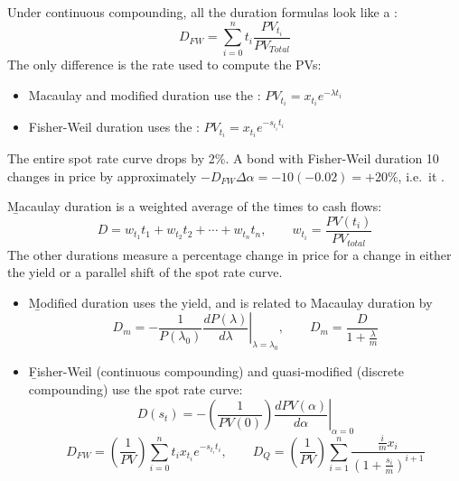 Under continuous compounding, all the duration formulas look like a :
\[D_{FW} = \sum_{i=0}^{n}t_i\frac{PV_{t_i}}{PV_{Total}}\]
The only difference is the rate used to compute the PVs:
\begin{itemize}
    \item Macaulay and modified duration use the : $PV_{t_i} = x_{t_i}e^{-\lambda t_i}$
    \item Fisher-Weil duration uses the : $PV_{t_i} = x_{t_i}e^{-s_{t_i}t_i}$
\end{itemize}

\begin{example}
    \begin{center}
    \end{center}
    The entire spot rate curve drops by 2\%. A bond with Fisher-Weil duration 10 changes in price by approximately $-D_{FW}\Delta\alpha = -10(-0.02) = +20\%$, i.e.\ it .
\end{example}

\begin{framed}
    \b{Macaulay duration} is a weighted average of the times to cash flows:
    \[D = w_{t_1}t_1 + w_{t_2}t_2 + \cdots + w_{t_n}t_n, \qquad w_{t_i} = \frac{PV(t_i)}{PV_{total}}\]
    The other durations measure a percentage change in price for a change in either the yield or a parallel shift of the spot rate curve.
    \begin{itemize}
        \item \b{Modified duration} uses the yield, and is related to Macaulay duration by
        \[D_m = -\frac{1}{P(\lambda_0)}\left.\frac{dP(\lambda)}{d\lambda}\right|_{\lambda=\lambda_0}, \qquad D_m = \frac{D}{1+\frac{\lambda}{m}}\]
        \item \b{Fisher-Weil} (continuous compounding) and \b{quasi-modified} (discrete compounding) use the spot rate curve:
        \[D(s_t) = -\left(\frac{1}{PV(0)}\right)\left.\frac{dPV(\alpha)}{d\alpha}\right|_{\alpha=0}\]
        \[D_{FW} = \left(\frac{1}{PV}\right)\sum_{i=0}^{n}t_i x_{t_i}e^{-s_{t_i}t_i}, \qquad D_Q = \left(\frac{1}{PV}\right)\sum_{i=1}^{n}\frac{\frac{i}{m}x_i}{\left(1+\frac{s_i}{m}\right)^{i+1}}\]
    \end{itemize}
\end{framed}
